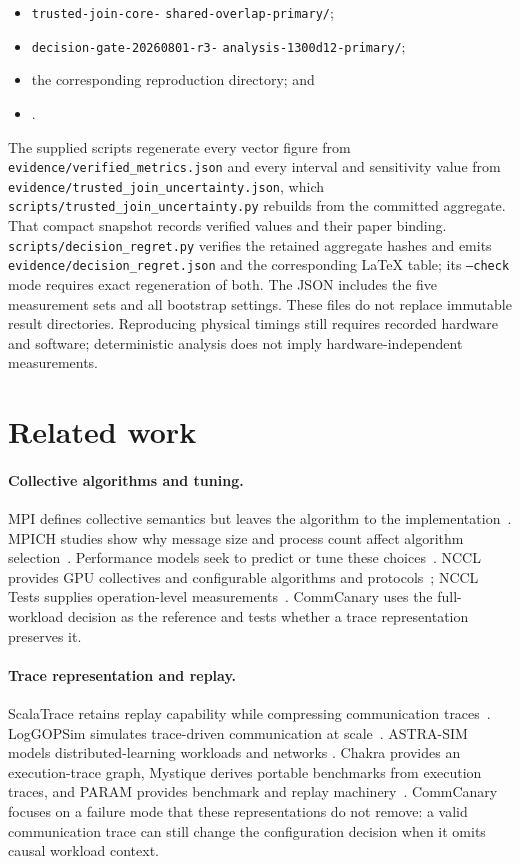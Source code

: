 \documentclass[10pt,twocolumn]{article}
\begin{document}
\begin{itemize}
  \item \texttt{trusted-join-core-}\allowbreak
    \texttt{shared-overlap-primary/};
  \item \texttt{decision-gate-20260801-r3-}\allowbreak
    \texttt{analysis-1300d12-primary/};
  \item the corresponding reproduction directory; and
  \item {}.
\end{itemize}

The supplied scripts regenerate every vector figure from
\texttt{evidence/verified\_metrics.json} and every interval and sensitivity
value from \texttt{evidence/trusted\_join\_uncertainty.json}, which
\texttt{scripts/trusted\_join\_uncertainty.py} rebuilds from the committed
aggregate. That compact snapshot records verified
values and their paper binding.
\texttt{scripts/decision\_regret.py} verifies the retained aggregate hashes
and emits \texttt{evidence/decision\_regret.json} and the corresponding
LaTeX table; its \texttt{--check} mode requires exact regeneration of both.
The JSON includes the five measurement sets and all bootstrap settings.
These files do not replace immutable result
directories. Reproducing physical timings still requires recorded hardware and
software; deterministic analysis does not imply hardware-independent
measurements.

\section{Related work}

\paragraph{Collective algorithms and tuning.} MPI defines collective semantics
but leaves the algorithm to the implementation~\cite{mpi}. MPICH studies show
why message size and process count affect algorithm selection~\cite{thakur}.
Performance models seek to predict or tune these choices~\cite{vadhiyar}. NCCL
provides GPU collectives and configurable algorithms and protocols~\cite{nccl};
NCCL Tests supplies operation-level measurements~\cite{nccltests}. CommCanary
uses the full-workload decision as the reference and tests whether a trace
representation preserves it.

\paragraph{Trace representation and replay.} ScalaTrace retains replay
capability while compressing communication traces~\cite{scalatrace}.
LogGOPSim simulates trace-driven communication at scale~\cite{loggopsim}.
ASTRA-SIM models distributed-learning workloads and networks
\cite{astrasim,astrasim2}. Chakra provides an execution-trace graph, Mystique
derives portable benchmarks from execution traces, and PARAM provides benchmark
and replay machinery~\cite{chakra,mystique,param}. CommCanary focuses on a
failure mode that these representations do not remove: a valid communication
trace can still change the configuration decision when it omits causal workload
context.
\end{document}
